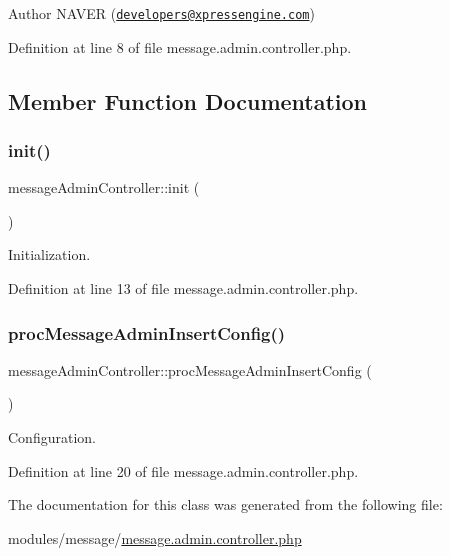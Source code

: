\begin{DoxyAuthor}{Author}
N\+A\+V\+ER (\href{mailto:developers@xpressengine.com}{\tt developers@xpressengine.\+com}) 
\end{DoxyAuthor}


Definition at line 8 of file message.\+admin.\+controller.\+php.



\subsection{Member Function Documentation}
\hypertarget{classmessageAdminController_a926ccd4bc380531ba15d2df608416d1d}{}\label{classmessageAdminController_a926ccd4bc380531ba15d2df608416d1d} 
\subsubsection{\texorpdfstring{init()}{init()}}
{\footnotesize\ttfamily message\+Admin\+Controller\+::init (\begin{DoxyParamCaption}{ }\end{DoxyParamCaption})}



Initialization. 



Definition at line 13 of file message.\+admin.\+controller.\+php.

\hypertarget{classmessageAdminController_aedd1f833e2dd057dc55eb062b0d8ce0d}{}\label{classmessageAdminController_aedd1f833e2dd057dc55eb062b0d8ce0d} 
\subsubsection{\texorpdfstring{proc\+Message\+Admin\+Insert\+Config()}{procMessageAdminInsertConfig()}}
{\footnotesize\ttfamily message\+Admin\+Controller\+::proc\+Message\+Admin\+Insert\+Config (\begin{DoxyParamCaption}{ }\end{DoxyParamCaption})}



Configuration. 



Definition at line 20 of file message.\+admin.\+controller.\+php.



The documentation for this class was generated from the following file\+:\begin{DoxyCompactItemize}
\item 
modules/message/\hyperlink{message_8admin_8controller_8php}{message.\+admin.\+controller.\+php}\end{DoxyCompactItemize}
